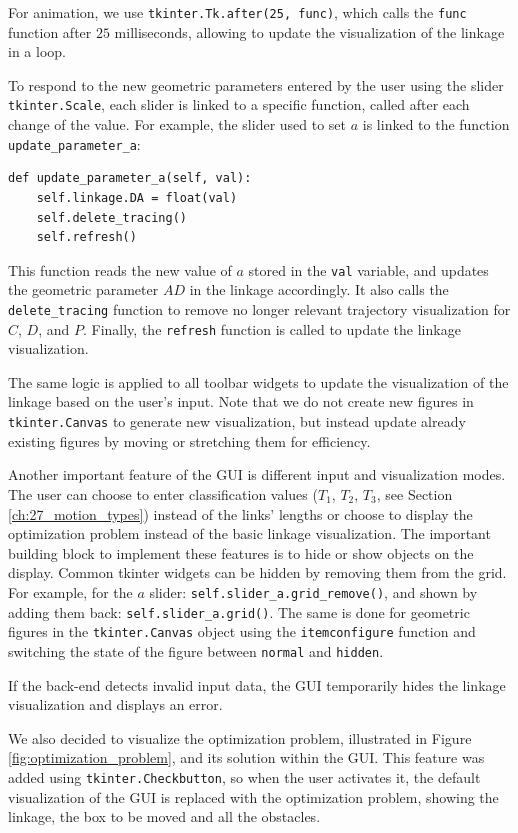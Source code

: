 \documentclass{article}
\begin{document}
For animation, we use \texttt{tkinter.Tk.after(25, func)}, which calls the \texttt{func} function after $25$ milliseconds, allowing to update the visualization of the linkage in a loop.

To respond to the new geometric parameters entered by the user using the slider \texttt{tkinter.Scale}, each slider is linked to a specific function, called after each change of the value. For example, the slider used to set $a$ is linked to the function \texttt{update\_parameter\_a}: 

\begin{lstlisting}
def update_parameter_a(self, val):
	self.linkage.DA = float(val)
	self.delete_tracing()
	self.refresh()
\end{lstlisting}

This function reads the new value of $a$ stored in the \texttt{val} variable, and updates the geometric parameter $AD$ in the linkage accordingly. It also calls the \texttt{delete\_tracing} function to remove no longer relevant trajectory visualization for $C$, $D$, and $P$. Finally, the \texttt{refresh} function is called to update the linkage visualization.

The same logic is applied to all toolbar widgets to update the visualization of the linkage based on the user's input. Note that we do not create new figures in \texttt{tkinter.Canvas} to generate new visualization, but instead update already existing figures by moving or stretching them for efficiency.

Another important feature of the GUI is different input and visualization modes. The user can choose to enter classification values ($T_1$, $T_2$, $T_3$, see Section \ref{ch:27_motion_types}) instead of the links' lengths or choose to display the optimization problem instead of the basic linkage visualization. The important building block to implement these features is to hide or show objects on the display. Common tkinter widgets can be hidden by removing them from the grid. For example, for the $a$ slider: \lstinline|self.slider_a.grid_remove()|, and shown by adding them back: \lstinline|self.slider_a.grid()|. The same is done for geometric figures in the \texttt{tkinter.Canvas} object using the \texttt{itemconfigure} function and switching the state of the figure between \texttt{normal} and \texttt{hidden}.

If the back-end detects invalid input data, the GUI temporarily hides the linkage visualization and displays an error.

We also decided to visualize the optimization problem, illustrated in Figure \ref{fig:optimization_problem}, and its solution within the GUI. This feature was added using \texttt{tkinter.Checkbutton}, so when the user activates it, the default visualization of the GUI is replaced with the optimization problem, showing the linkage, the box to be moved and all the obstacles.
\end{document}

